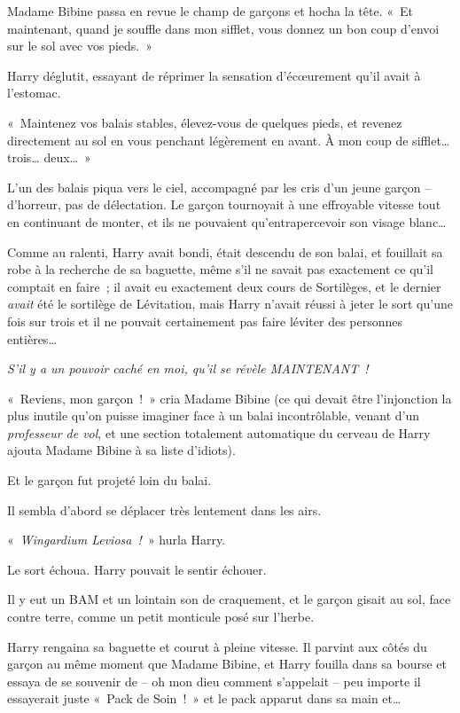 Madame Bibine passa en revue le champ de garçons et hocha la tête. «~Et maintenant, quand je souffle dans mon sifflet, vous donnez un bon coup d'envoi sur le sol avec vos pieds.~»

Harry déglutit, essayant de réprimer la sensation d'écœurement qu'il avait à l'estomac.

«~Maintenez vos balais stables, élevez-vous de quelques pieds, et revenez directement au sol en vous penchant légèrement en avant. À mon coup de sifflet… trois… deux…~»

L'un des balais piqua vers le ciel, accompagné par les cris d'un jeune garçon -- d'horreur, pas de délectation. Le garçon tournoyait à une effroyable vitesse tout en continuant de monter, et ils ne pouvaient qu'entrapercevoir son visage blanc…

Comme au ralenti, Harry avait bondi, était descendu de son balai, et fouillait sa robe à la recherche de sa baguette, même s'il ne savait pas exactement ce qu'il comptait en faire~; il avait eu exactement deux cours de Sortilèges, et le dernier \emph{avait} été le sortilège de Lévitation, mais Harry n'avait réussi à jeter le sort qu'une fois sur trois et il ne pouvait certainement pas faire léviter des personnes entières…

\emph{S'il y a un pouvoir caché en moi, qu'il se révèle MAINTENANT~!}

«~Reviens, mon garçon~!~» cria Madame Bibine (ce qui devait être l'injonction la plus inutile qu'on puisse imaginer face à un balai incontrôlable, venant d'un \emph{professeur de vol}, et une section totalement automatique du cerveau de Harry ajouta Madame Bibine à sa liste d'idiots).

Et le garçon fut projeté loin du balai.

Il sembla d'abord se déplacer très lentement dans les airs.

«~\emph{Wingardium Leviosa~!}~» hurla Harry.

Le sort échoua. Harry pouvait le sentir échouer.

Il y eut un BAM et un lointain son de craquement, et le garçon gisait au sol, face contre terre, comme un petit monticule posé sur l'herbe.

Harry rengaina sa baguette et courut à pleine vitesse. Il parvint aux côtés du garçon au même moment que Madame Bibine, et Harry fouilla dans sa bourse et essaya de se souvenir de -- oh mon dieu comment s'appelait -- peu importe il essayerait juste «~Pack de Soin~!~» et le pack apparut dans sa main et…

